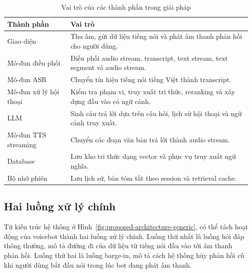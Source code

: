 \documentclass[a4paper,13pt,twoside]{report}
\begin{document}
\begin{table}[H]
    \centering
    \begin{tabular}{|p{3.2cm}|p{10cm}|}
        \hline
        \textbf{Thành phần}    & \textbf{Vai trò}                                                                 \\
        \hline
        Giao diện              & Thu âm, gửi dữ liệu tiếng nói và phát âm thanh phản hồi cho người dùng.          \\
        \hline
        Mô-đun điều phối       & Điều phối audio stream, transcript, text stream, text segment và audio stream.   \\
        \hline
        Mô-đun ASR             & Chuyển tín hiệu tiếng nói tiếng Việt thành transcript.                           \\
        \hline
        Mô-đun xử lý hội thoại & Kiểm tra phạm vi, truy xuất tri thức, reranking và xây dựng đầu vào có ngữ cảnh. \\
        \hline
        LLM                    & Sinh câu trả lời dựa trên câu hỏi, lịch sử hội thoại và ngữ cảnh truy xuất.      \\
        \hline
        Mô-đun TTS streaming   & Chuyển các đoạn văn bản trả lời thành audio stream.                              \\
        \hline
        Database               & Lưu kho tri thức dạng vector và phục vụ truy xuất ngữ nghĩa.                     \\
        \hline
        Bộ nhớ phiên           & Lưu lịch sử, bản tóm tắt theo session và retrieval cache.                        \\
        \hline
    \end{tabular}
    \caption{Vai trò của các thành phần trong giải pháp}
    \label{tab:component-roles}
\end{table}

\subsection{Hai luồng xử lý chính}

Từ kiến trúc hệ thống ở Hình~\ref{fig:proposed-architecture-generic}, có thể tách hoạt động của voicebot thành hai luồng xử lý chính. Luồng thứ nhất là luồng hỏi đáp thông thường, mô tả đường đi của dữ liệu từ tiếng nói đầu vào tới âm thanh phản hồi. Luồng thứ hai là luồng barge-in, mô tả cách hệ thống hủy phản hồi cũ khi người dùng bắt đầu nói trong lúc bot đang phát âm thanh.
\end{document}
